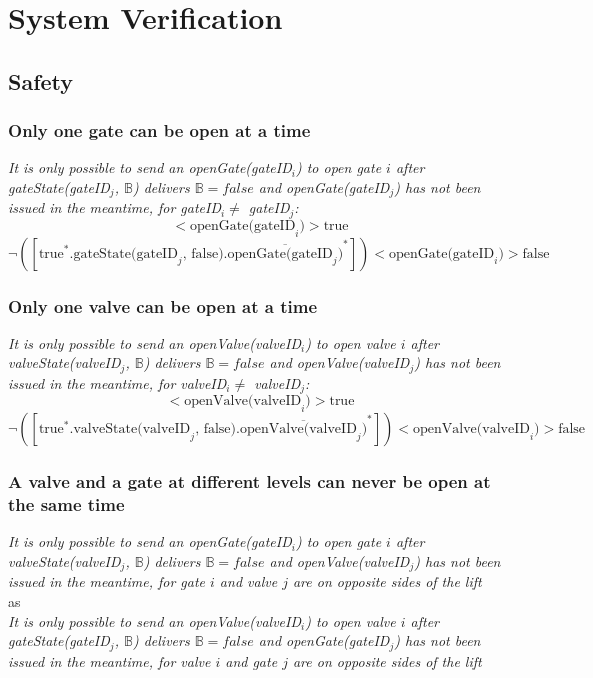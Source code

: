 \section{System Verification}
\subsection{Safety}
\subsubsection{Only one gate can be open at a time}
	\textit{It is only possible to send an openGate(gateID$_i$) to open gate $i$ after gateState(gateID$_j$, $ \mathbb{B} $) delivers $\mathbb{B} = false$ and openGate(gateID$_j$) has not been issued in the meantime, for gateID$_i \neq$ gateID$_j$:}\\
	\begin{equation*}
		[\textrm{true}^*.\textrm{gateState(gateID}_j\textrm{, false}).\overline{\textrm{openGate(gateID}_j)}^*]<\textrm{openGate(gateID}_i)>\textrm{true}
	\end{equation*}
	\begin{equation*}
	\neg([\textrm{true}^*.\textrm{gateState(gateID}_j\textrm{, false}).\overline{\textrm{openGate(gateID}_j)}^*])<\textrm{openGate(gateID}_i)>\textrm{false}
	\end{equation*}
	
	
\subsubsection{Only one valve can be open at a time}
	\textit{It is only possible to send an openValve(valveID$_i$) to open valve $i$ after valveState(valveID$_j$, $ \mathbb{B} $) delivers $\mathbb{B} = false$ and openValve(valveID$_j$) has not been issued in the meantime, for valveID$_i \neq$ valveID$_j$:}\\
	\begin{equation*}
	[\textrm{true}^*.\textrm{valveState(valveID}_j\textrm{, false}).\overline{\textrm{openValve(valveID}_j)}^*]<\textrm{openValve(valveID}_i)>\textrm{true}
	\end{equation*}
	\begin{equation*}
	\neg([\textrm{true}^*.\textrm{valveState(valveID}_j\textrm{, false}).\overline{\textrm{openValve(valveID}_j)}^*])<\textrm{openValve(valveID}_i)>\textrm{false}
	\end{equation*}
	
\subsubsection{A valve and a gate at different levels can never be open at the same time}
	\textit{It is only possible to send an openGate(gateID$_i$) to open gate $i$ after valveState(valveID$_j$, $ \mathbb{B} $) delivers $\mathbb{B} = false$ and openValve(valveID$_j$) has not been issued in the meantime, for gate $i$ and valve $j$ are on opposite sides of the lift}\\
	
	as\\
	
	
	\noindent\textit{It is only possible to send an openValve(valveID$_i$) to open valve $i$ after gateState(gateID$_j$, $ \mathbb{B} $) delivers $\mathbb{B} = false$ and openGate(gateID$_j$) has not been issued in the meantime, for valve $i$ and gate $j$ are on opposite sides of the lift}